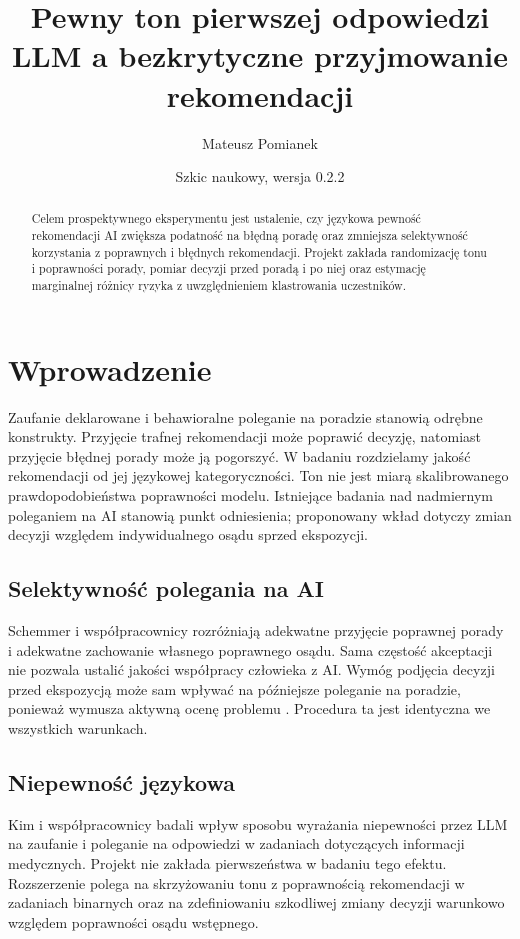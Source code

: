 \documentclass[11pt,a4paper]{article}
\title{Pewny ton pierwszej odpowiedzi LLM a bezkrytyczne przyjmowanie rekomendacji}
\author{Mateusz Pomianek}
\date{Szkic naukowy, wersja 0.2.2}
\begin{document}
\maketitle
\begin{abstract}
Celem prospektywnego eksperymentu jest ustalenie, czy językowa pewność rekomendacji AI zwiększa podatność na błędną poradę oraz zmniejsza selektywność korzystania z poprawnych i błędnych rekomendacji. Projekt zakłada randomizację tonu i poprawności porady, pomiar decyzji przed poradą i po niej oraz estymację marginalnej różnicy ryzyka z uwzględnieniem klastrowania uczestników.
\end{abstract}
\section{Wprowadzenie}
Zaufanie deklarowane i behawioralne poleganie na poradzie stanowią odrębne konstrukty. Przyjęcie trafnej rekomendacji może poprawić decyzję, natomiast przyjęcie błędnej porady może ją pogorszyć. W badaniu rozdzielamy jakość rekomendacji od jej językowej kategoryczności. Ton nie jest miarą skalibrowanego prawdopodobieństwa poprawności modelu. Istniejące badania nad nadmiernym poleganiem na AI \cite{overreliance} stanowią punkt odniesienia; proponowany wkład dotyczy zmian decyzji względem indywidualnego osądu sprzed ekspozycji.
\subsection{Selektywność polegania na AI}
Schemmer i współpracownicy \cite{schemmer} rozróżniają adekwatne przyjęcie poprawnej porady i adekwatne zachowanie własnego poprawnego osądu. Sama częstość akceptacji nie pozwala ustalić jakości współpracy człowieka z AI. Wymóg podjęcia decyzji przed ekspozycją może sam wpływać na późniejsze poleganie na poradzie, ponieważ wymusza aktywną ocenę problemu \cite{bucinca}. Procedura ta jest identyczna we wszystkich warunkach.
\subsection{Niepewność językowa}
Kim i współpracownicy \cite{kim} badali wpływ sposobu wyrażania niepewności przez LLM na zaufanie i poleganie na odpowiedzi w zadaniach dotyczących informacji medycznych. Projekt nie zakłada pierwszeństwa w badaniu tego efektu. Rozszerzenie polega na skrzyżowaniu tonu z poprawnością rekomendacji w zadaniach binarnych oraz na zdefiniowaniu szkodliwej zmiany decyzji warunkowo względem poprawności osądu wstępnego.
\end{document}

